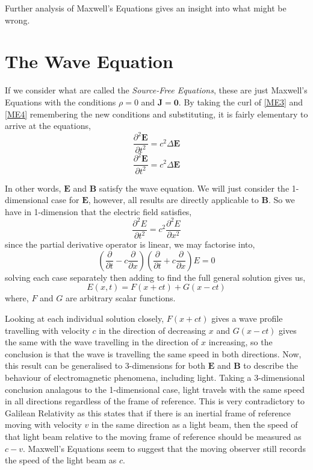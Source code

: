 \documentclass[a4paper,12pt,draft]{report}
\begin{document}
Further analysis of Maxwell's Equations gives an insight into what might be wrong.

\section{The Wave Equation}

If we consider what are called the \emph{Source-Free Equations}, these are just Maxwell's Equations with the conditions $\rho = 0$ and $\mathbf{J} = \mathbf{0}$. By taking the curl of \eqref{ME3} and \eqref{ME4} remembering the new conditions and substituting, it is fairly elementary to arrive at the equations,
\begin{equation}
\frac{\partial^2\mathbf{E}}{\partial t^2} = c^2 \Delta\mathbf{E}
\end{equation}
\begin{equation}
\frac{\partial^2\mathbf{E}}{\partial t^2} = c^2 \Delta\mathbf{E}
\end{equation}

In other words, $\mathbf{E}$ and $\mathbf{B}$ satisfy the wave equation. We will just consider the 1-dimensional case for $\mathbf{E}$, however, all results are directly applicable to $\mathbf{B}$. So we have in 1-dimension that the electric field satisfies,
$$
\frac{\partial^2 E}{\partial t^2} = c^2 \frac{\partial^2 E}{\partial x^2}
$$
since the partial derivative operator is linear, we may factorise into,
$$
\left(\frac{\partial}{\partial t} - c\frac{\partial}{\partial x}\right)\left(\frac{\partial}{\partial t} + c\frac{\partial}{\partial x}\right)E = 0
$$
solving each case separately then adding to find the full general solution gives us,
$$
E(x, t) = F(x + ct) + G(x - ct)
$$
where, $F$ and $G$ are arbitrary scalar functions.

Looking at each individual solution closely, $F(x + ct)$ gives a wave profile travelling with velocity $c$ in the direction of decreasing $x$ and $G(x - ct)$ gives the same with the wave travelling in the direction of $x$ increasing, so the conclusion is that the wave is travelling the same speed in both directions. Now, this result can be generalised to 3-dimensions for both $\mathbf{E}$ and $\mathbf{B}$ to describe the behaviour of electromagnetic phenomena, including light. Taking a 3-dimensional conclusion analagous to the 1-dimensional case, light travels with the same speed in all directions regardless of the frame of reference. This is very contradictory to Galilean Relativity as this states that if there is an inertial frame of reference moving with velocity $v$ in the same direction as a light beam, then the speed of that light beam relative to the moving frame of reference should be measured as $c - v$. Maxwell's Equations seem to suggest that the moving observer still records the speed of the light beam as $c$.
\end{document}
